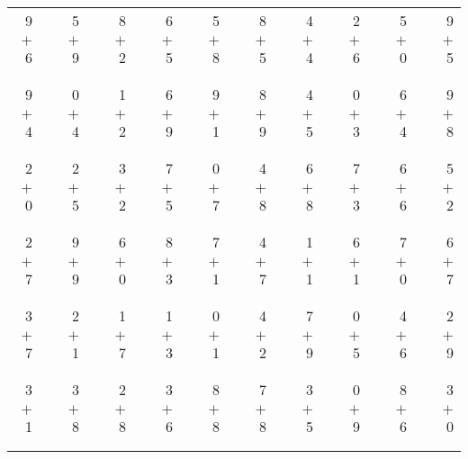 \documentclass[12pt, letterpaper]{article}
\begin{document}
\begin{tabular}{rrrrrrrrrrrrrrrrrrr}
9 & & 5 & & 8 & & 6 & & 5 & & 8 & & 4 & & 2 & & 5 & & 9\\
$+$ 6 & & $+$ 9 & & $+$ 2 & & $+$ 5 & & $+$ 8 & & $+$ 5 & & $+$ 4 & & $+$ 6 & & $+$ 0 & & $+$ 5\\
\cline{1-1} \cline{3-3} \cline{5-5} \cline{7-7} \cline{9-9} \cline{11-11} \cline{13-13} \cline{15-15} \cline{17-17} \cline{19-19} \\ \\
9 & & 0 & & 1 & & 6 & & 9 & & 8 & & 4 & & 0 & & 6 & & 9\\
$+$ 4 & & $+$ 4 & & $+$ 2 & & $+$ 9 & & $+$ 1 & & $+$ 9 & & $+$ 5 & & $+$ 3 & & $+$ 4 & & $+$ 8\\
\cline{1-1} \cline{3-3} \cline{5-5} \cline{7-7} \cline{9-9} \cline{11-11} \cline{13-13} \cline{15-15} \cline{17-17} \cline{19-19} \\ \\
2 & & 2 & & 3 & & 7 & & 0 & & 4 & & 6 & & 7 & & 6 & & 5\\
$+$ 0 & & $+$ 5 & & $+$ 2 & & $+$ 5 & & $+$ 7 & & $+$ 8 & & $+$ 8 & & $+$ 3 & & $+$ 6 & & $+$ 2\\
\cline{1-1} \cline{3-3} \cline{5-5} \cline{7-7} \cline{9-9} \cline{11-11} \cline{13-13} \cline{15-15} \cline{17-17} \cline{19-19} \\ \\
2 & & 9 & & 6 & & 8 & & 7 & & 4 & & 1 & & 6 & & 7 & & 6\\
$+$ 7 & & $+$ 9 & & $+$ 0 & & $+$ 3 & & $+$ 1 & & $+$ 7 & & $+$ 1 & & $+$ 1 & & $+$ 0 & & $+$ 7\\
\cline{1-1} \cline{3-3} \cline{5-5} \cline{7-7} \cline{9-9} \cline{11-11} \cline{13-13} \cline{15-15} \cline{17-17} \cline{19-19} \\ \\
3 & & 2 & & 1 & & 1 & & 0 & & 4 & & 7 & & 0 & & 4 & & 2\\
$+$ 7 & & $+$ 1 & & $+$ 7 & & $+$ 3 & & $+$ 1 & & $+$ 2 & & $+$ 9 & & $+$ 5 & & $+$ 6 & & $+$ 9\\
\cline{1-1} \cline{3-3} \cline{5-5} \cline{7-7} \cline{9-9} \cline{11-11} \cline{13-13} \cline{15-15} \cline{17-17} \cline{19-19} \\ \\
3 & & 3 & & 2 & & 3 & & 8 & & 7 & & 3 & & 0 & & 8 & & 3\\
$+$ 1 & & $+$ 8 & & $+$ 8 & & $+$ 6 & & $+$ 8 & & $+$ 8 & & $+$ 5 & & $+$ 9 & & $+$ 6 & & $+$ 0\\
\cline{1-1} \cline{3-3} \cline{5-5} \cline{7-7} \cline{9-9} \cline{11-11} \cline{13-13} \cline{15-15} \cline{17-17} \cline{19-19} \\ \\

\end{tabular}
\end{document}
